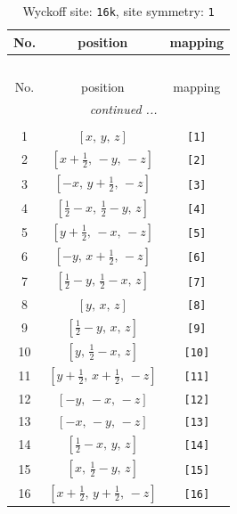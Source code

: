 \documentclass[fleqn,8pt]{jsarticle}
\begin{document}
\begin{longtable}{ccc}
\caption{Wyckoff site: {\tt 16k}, site symmetry: {\tt 1}}
 \\
 \hline \hline
No. & position & mapping \\ \hline \endfirsthead

\multicolumn{2}{l}{\tablename\ \thetable{}} \\
 \hline \hline
No. & position & mapping \\ \hline \endhead

 \hline \hline
\multicolumn{2}{r}{\footnotesize\it continued ...} \\ \endfoot

 \hline \hline
\multicolumn{2}{r}{} \\ \endlastfoot

1 & $\left[ x,\, y,\, z \right]$ & {\tt [1]} \\ \hline
2 & $\left[ x + \frac{1}{2},\, - y,\, - z \right]$ & {\tt [2]} \\ \hline
3 & $\left[ - x,\, y + \frac{1}{2},\, - z \right]$ & {\tt [3]} \\ \hline
4 & $\left[ \frac{1}{2} - x,\, \frac{1}{2} - y,\, z \right]$ & {\tt [4]} \\ \hline
5 & $\left[ y + \frac{1}{2},\, - x,\, - z \right]$ & {\tt [5]} \\ \hline
6 & $\left[ - y,\, x + \frac{1}{2},\, - z \right]$ & {\tt [6]} \\ \hline
7 & $\left[ \frac{1}{2} - y,\, \frac{1}{2} - x,\, z \right]$ & {\tt [7]} \\ \hline
8 & $\left[ y,\, x,\, z \right]$ & {\tt [8]} \\ \hline
9 & $\left[ \frac{1}{2} - y,\, x,\, z \right]$ & {\tt [9]} \\ \hline
10 & $\left[ y,\, \frac{1}{2} - x,\, z \right]$ & {\tt [10]} \\ \hline
11 & $\left[ y + \frac{1}{2},\, x + \frac{1}{2},\, - z \right]$ & {\tt [11]} \\ \hline
12 & $\left[ - y,\, - x,\, - z \right]$ & {\tt [12]} \\ \hline
13 & $\left[ - x,\, - y,\, - z \right]$ & {\tt [13]} \\ \hline
14 & $\left[ \frac{1}{2} - x,\, y,\, z \right]$ & {\tt [14]} \\ \hline
15 & $\left[ x,\, \frac{1}{2} - y,\, z \right]$ & {\tt [15]} \\ \hline
16 & $\left[ x + \frac{1}{2},\, y + \frac{1}{2},\, - z \right]$ & {\tt [16]} \\
\end{longtable}
\end{document}
